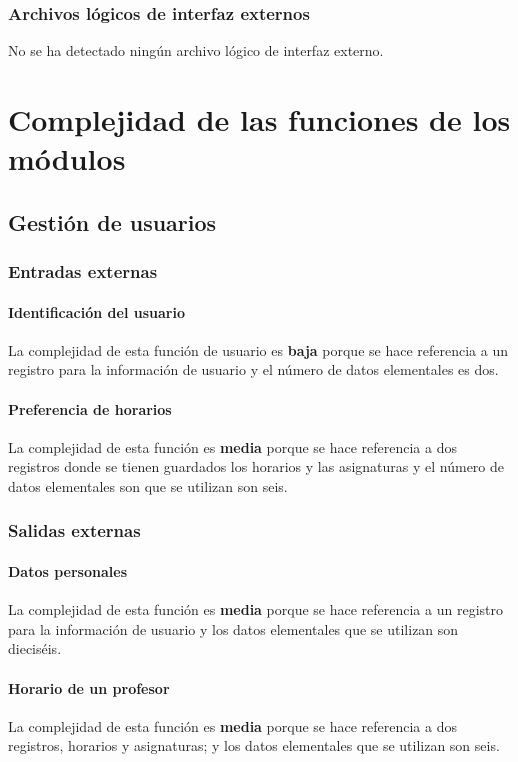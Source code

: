 \documentclass[11pt,a4paper,spanish,twoside]{book}
\begin{document}
\subsection{Archivos lógicos de interfaz externos}
No se ha detectado ningún archivo lógico de interfaz externo.

\chapter{Complejidad de las funciones de los  módulos} \label{cap:com}
\section{Gestión de usuarios}
\subsection{Entradas externas}
\subsubsection{Identificación del usuario}
La complejidad de esta función de usuario es \textbf{baja} porque se hace
referencia a un registro para la información de usuario y el número de datos
elementales es dos. 

\subsubsection{Preferencia de horarios} 
La complejidad de esta función es \textbf{media} porque se hace
referencia a dos registros donde se tienen guardados los horarios y las
asignaturas y el número de datos elementales son que se utilizan son seis. 

\subsection{Salidas externas}
\subsubsection{Datos personales}
La complejidad de esta función es \textbf{media} porque se hace referencia a
un registro para la información de usuario y los datos elementales que se
utilizan son dieciséis.

\subsubsection{Horario de un profesor}
La complejidad de esta función es \textbf{media} porque se hace referencia a
dos registros, horarios y asignaturas; y los datos elementales que
se utilizan son seis.
\end{document}
